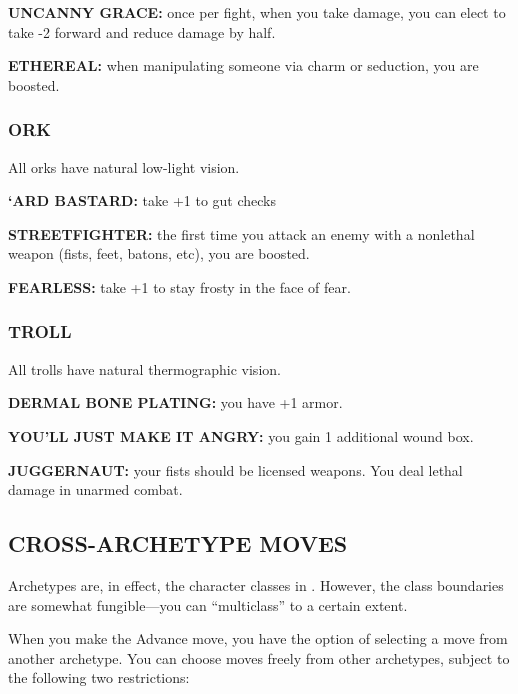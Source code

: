 \documentclass[oneside,10pt]{article}
\begin{document}
\begin{multicols}{2}
\begin{adjustwidth*}{.5cm}{.5cm}
\textbf{UNCANNY GRACE:} once per fight, when you take damage,
you can elect to take -2 forward and reduce damage
by half.

\textbf{ETHEREAL:} when manipulating someone via charm or seduction, you are boosted.
\end{adjustwidth*}

\subsubsection{ORK}

All orks have natural low-light vision.

\begin{adjustwidth*}{.5cm}{.5cm}

\textbf{‘ARD BASTARD:} take +1 to gut checks

\textbf{STREETFIGHTER:} the first time you attack an enemy with a
nonlethal weapon (fists, feet, batons, etc), you
are boosted.

\textbf{FEARLESS:} take +1 to stay frosty in the face of fear.
\end{adjustwidth*}

\subsubsection{TROLL}
All trolls have natural thermographic vision.

\begin{adjustwidth*}{.5cm}{.5cm}

\textbf{DERMAL BONE PLATING:} you have +1 armor.

\textbf{YOU’LL JUST MAKE IT ANGRY:} you gain 1 additional wound
box.

\textbf{JUGGERNAUT:} your fists should be licensed weapons. You
deal lethal damage in unarmed combat.
\end{adjustwidth*}


\subsection{CROSS-ARCHETYPE MOVES}
Archetypes are, in effect, the character classes in \SW{}.
However, the class boundaries are somewhat fungible—you
can “multiclass” to a certain extent.

When you make the Advance move, you have the option of
selecting a move from another archetype. You can choose
moves freely from other archetypes, subject to the following
two restrictions:
\begin{adjustwidth*}{.5cm}{.5cm}


\end{adjustwidth*}
\end{multicols}
\end{document}
